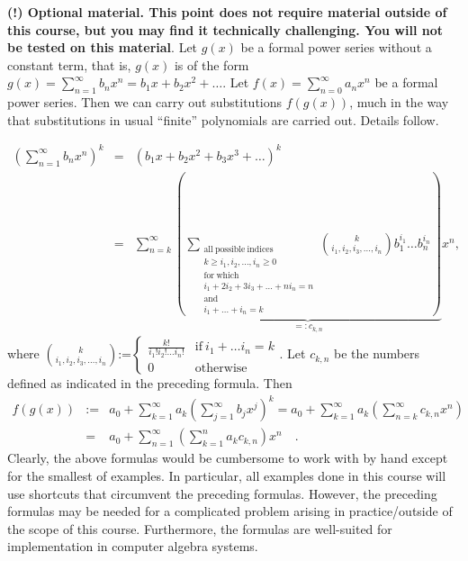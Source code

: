 \documentclass[12pt]{book}
\newcommand{\eqdef}{\textbf{:=}}
\newcommand{\doublebrace}[4]{\left\{\begin{array}{ll} #1 & #2 \\#3 & #4  \end{array} \right.}
\begin{document}
\textbf{(!) Optional material. This point does not require material outside of this course, but you may find it technically challenging. You will not be tested on this material}. Let $g(x)$ be a formal power series without a constant term, that is, $g(x)$ is of the form $g(x)=\sum_{n=1}^\infty b_n x^n=  b_1x+b_2x^2+\dots$. Let $f(x)=\sum_{n=0}^{\infty} a_n x^n$ be a formal power series. Then we can carry out substitutions $f(g(x))$, much in the way that substitutions in usual ``finite'' polynomials are carried out. Details follow.

\[
\begin{array}{rcl}
\displaystyle
\left(\sum_{n=1}^{\infty} b_n x^n\right)^k &=&   (b_1 x+ b_2x^2+b_3x^3+\dots)^k\\
&=&\displaystyle \sum_{n=k}^{\infty}\underbrace{\left( \sum_{\substack{\mathrm{all~possible~indices}\\ k\geq i_1, i_2,\dots, i_n\geq 0\\ 
\mathrm{for~which}\\i_1+2i_2+3i_3+\dots + ni_n =n  \\ \mathrm{and} \\ i_1+\dots +i_n=k}}\binom{k}{i_1, i_2, i_3, \dots, i_n}  b_{1}^{i_1}\dots b_{n}^{i_n} \right)}_{=: c_{k,n}} x^n,
\end{array}
\]
where $\binom{k}{i_1, i_2, i_3, \dots, i_n}\eqdef  \doublebrace{\frac{k!}{i_1!i_2!\dots i_n!}}{\mathrm{if~}i_1+\dots i_n=k}{0}{\mathrm{otherwise}}$. Let $c_{k,n}$ be the numbers defined as indicated in the preceding formula. Then
\[
\begin{array}{rcl}
f(g(x)) &\eqdef&\displaystyle a_0+ \sum_{k=1}^\infty a_k\left(\sum_{j=1}^{\infty} b_j x^j\right)^k = a_0+\sum_{k=1}^\infty a_k \left(\sum_{n=k}^{\infty} c_{k,n}x^n \right)\\
&=&\displaystyle a_0+\sum_{n=1}^{\infty} \left(\sum_{k=1}^n a_k c_{k,n} \right)x^n\quad .
\end{array}
\]
Clearly, the above formulas would be cumbersome to work with by hand except for the smallest of examples. In particular, all examples done in this course will use shortcuts that circumvent the preceding formulas. However, the preceding formulas may be needed for a complicated problem arising in practice/outside of the scope of this course. Furthermore, the formulas are well-suited for implementation in computer algebra systems.
\end{document}
